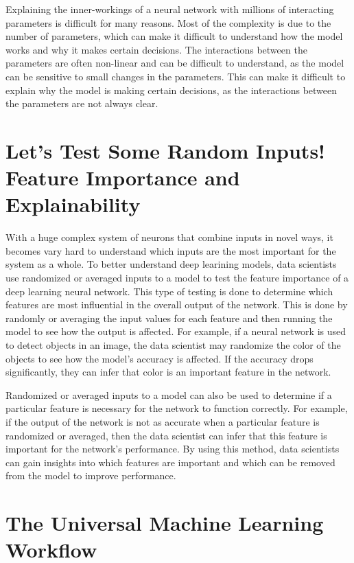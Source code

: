 Explaining the inner-workings of a neural network with millions of interacting parameters is difficult for many reasons. Most of the complexity is due to the number of parameters, which can make it difficult to understand how the model works and why it makes certain decisions. The interactions between the parameters are often non-linear and can be difficult to understand, as the model can be sensitive to small changes in the parameters. This can make it difficult to explain why the model is making certain decisions, as the interactions between the parameters are not always clear.

\section{Let's Test Some Random Inputs! Feature Importance and Explainability}

With a huge complex system of neurons that combine inputs in novel ways, it becomes vary hard to understand which inputs are the most important for the system as a whole. To better understand deep learining models, data scientists use randomized or averaged inputs to a model to test the feature importance of a deep learning neural network. This type of testing is done to determine which features are most influential in the overall output of the network. This is done by randomly or averaging the input values for each feature and then running the model to see how the output is affected. For example, if a neural network is used to detect objects in an image, the data scientist may randomize the color of the objects to see how the model’s accuracy is affected. If the accuracy drops significantly, they can infer that color is an important feature in the network.

Randomized or averaged inputs to a model can also be used to determine if a particular feature is necessary for the network to function correctly. For example, if the output of the network is not as accurate when a particular feature is randomized or averaged, then the data scientist can infer that this feature is important for the network’s performance. By using this method, data scientists can gain insights into which features are important and which can be removed from the model to improve performance.

\section{The Universal Machine Learning Workflow}

